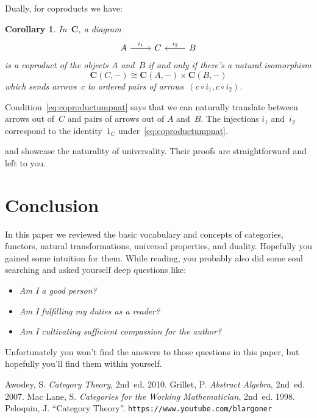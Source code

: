 \documentclass[letterpaper,12pt]{article}
\newcommand{\iso}{\cong}
\newcommand{\after}{\circ}
\newcommand{\cat}[1]{\mathbf{#1}}
\theoremstyle{definition}
\theoremstyle{plain}
\newtheorem{cor}[equation]{Corollary}
\numberwithin{equation}{section}
\begin{document}
Dually, for coproducts we have:
\begin{cor}
In~\(\cat{C}\), a diagram
\begin{equation*}
\begin{tikzcd}
A \ar[r,"i_1"] & C & B \ar[l,"i_2"']
\end{tikzcd}
\end{equation*}
is a coproduct of the objects \(A\) and~\(B\) if and only if there's a natural isomorphism
\begin{equation}
\cat{C}(C,-)\iso\cat{C}(A,-)\times\cat{C}(B,-)
\label{eq:coproductumpnat}
\end{equation}
which sends arrows~\(c\) to ordered pairs of arrows~\((c\after i_1,c\after i_2)\).
\label{cor:coproductumpnat}
\end{cor}
\noindent Condition~\eqref{eq:coproductumpnat} says that we can naturally translate between arrows out of~\(C\) and pairs of arrows out of \(A\) and~\(B\). The injections \(i_1\) and~\(i_2\) correspond to the identity~\(1_C\) under~\eqref{eq:coproductumpnat}.

 and  showcase the naturality of universality. Their proofs are straightforward and left to you.

\section*{Conclusion}
In this paper we reviewed the basic vocabulary and concepts of categories, functors, natural transformations, universal properties, and duality. Hopefully you gained some intuition for them. While reading, you probably also did some soul searching and asked yourself deep questions like:
\begin{itemize}
\item \emph{Am I a good person?}
\item \emph{Am I fulfilling my duties as a reader?}
\item \emph{Am I cultivating sufficient compassion for the author?}
\end{itemize}
Unfortunately you won't find the answers to those questions in this paper, but hopefully you'll find them within yourself.

\begin{thebibliography}{0}
 Awodey, S. \textit{Category Theory}, 2nd~ed. 2010.
 Grillet, P. \textit{Abstract Algebra}, 2nd~ed. 2007.
 Mac Lane, S. \textit{Categories for the Working Mathematician}, 2nd~ed. 1998.
 Peloquin, J. ``Category Theory''. \texttt{https://www.youtube.com/blargoner}
\end{thebibliography}
\end{document}
